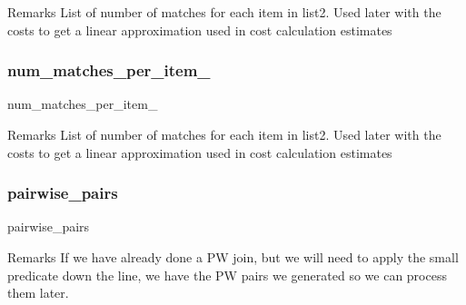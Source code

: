 \begin{DoxyRemark}{Remarks}
List of number of matches for each item in list2. Used later with the costs to get a linear approximation used in cost calculation estimates 
\end{DoxyRemark}
\mbox{\label{classdynamicfilterapp_1_1models_1_1_join_a8a9a495627c79f7bc67544c66197dd1c}} 
\subsubsection{\texorpdfstring{num\+\_\+matches\+\_\+per\+\_\+item\+\_}{num\_matches\_per\_item\_2}}
{\footnotesize\ttfamily num\+\_\+matches\+\_\+per\+\_\+item\+\_}

\begin{DoxyRemark}{Remarks}
List of number of matches for each item in list2. Used later with the costs to get a linear approximation used in cost calculation estimates 
\end{DoxyRemark}
\mbox{\label{classdynamicfilterapp_1_1models_1_1_join_ae4cce95db1dcc5f19be6454337d96841}} 
\subsubsection{\texorpdfstring{pairwise\+\_\+pairs}{pairwise\_pairs}}
{\footnotesize\ttfamily pairwise\+\_\+pairs}

\begin{DoxyRemark}{Remarks}
If we have already done a PW join, but we will need to apply the small predicate down the line, we have the PW pairs we generated so we can process them later. 
\end{DoxyRemark}
\mbox{\label{classdynamicfilterapp_1_1models_1_1_join_a2c37cdb35688296b995164b1b0142240}} 
